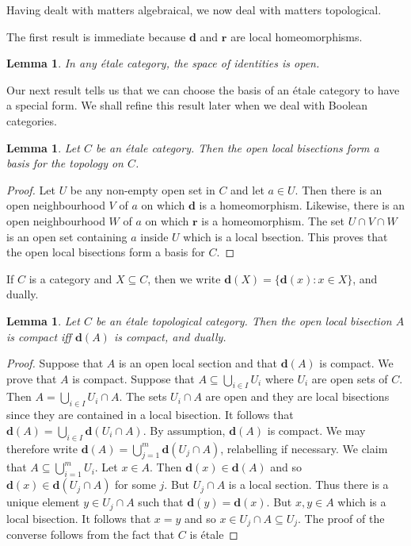 \documentclass[a4paper]{amsart}
\newtheorem{lemma}[theorem]{Lemma}
\begin{document}
Having dealt with matters algebraical, we now deal with matters topological.

The first result is immediate because $\mathbf{d}$ and $\mathbf{r}$ are local homeomorphisms.

\begin{lemma}
In any \'etale category, the space of identities is open.
\end{lemma}

Our next result tells us that we can choose the basis of an \'etale category to have a special form.
We shall refine this result later when we deal with Boolean categories.


\begin{lemma}\label{lem:basis-open-local-bisections} 
Let $C$ be an \'etale category.
Then the open local bisections form a basis for the topology on $C$.
\end{lemma}
\begin{proof} Let $U$ be any non-empty open set in $C$ and let $a \in U$.
Then there is an open neighbourhood $V$ of $a$ on which $\mathbf{d}$ is a homeomorphism.
Likewise, there is an open neighbourhood $W$ of $a$ on which $\mathbf{r}$ is a homeomorphism.
The set $U \cap V \cap W$ is an open set containing $a$ inside $U$ which is a local bsection.
This proves that the open local bisections form a basis for $C$.
\end{proof}

If $C$ is a category and $X \subseteq C$, then we write $\mathbf{d}(X) = \{\mathbf{d}(x) \colon x \in X \}$, and dually.

\begin{lemma}\label{lem:star-compact} Let $C$ be an  \'etale topological category.
Then the open local bisection $A$ is compact iff $\mathbf{d}(A)$ is compact, and dually.
\end{lemma}
\begin{proof} Suppose that $A$ is an open local section and that $\mathbf{d}(A)$ is compact.
We prove that $A$ is compact.
Suppose that $A \subseteq \bigcup_{i \in I}U_{i}$ where $U_{i}$ are open sets of $C$.
Then $A = \bigcup_{i \in I}U_{i} \cap A$.
The sets $U_{i} \cap A$ are open and they are local bisections since they are contained in a local bisection.
It follows that $\mathbf{d}(A) =  \bigcup_{i \in I}\mathbf{d}(U_{i} \cap A)$.
By assumption, $\mathbf{d}(A)$ is compact.
We may therefore write $\mathbf{d}(A) =  \bigcup_{j = 1}^{m} \mathbf{d}(U_{j} \cap A)$, relabelling if necessary.
We claim that  $A \subseteq \bigcup_{i = 1}^{m}U_{i}$. 
Let $x \in A$.
Then $\mathbf{d}(x) \in \mathbf{d}(A)$
and so $\mathbf{d}(x) \in \mathbf{d}(U_{j} \cap A)$ for some $j$.
But $U_{j} \cap A$ is a local section.
Thus there is a unique element $y \in U_{j} \cap A$ such that $\mathbf{d}(y) = \mathbf{d}(x)$.
But $x,y \in A$ which is a local bisection.
It follows that $x = y$ and so $x \in U_{j} \cap A \subseteq U_{j}$.
The proof of the converse follows from the fact that $C$ is \'etale
\end{proof}
\end{document}
